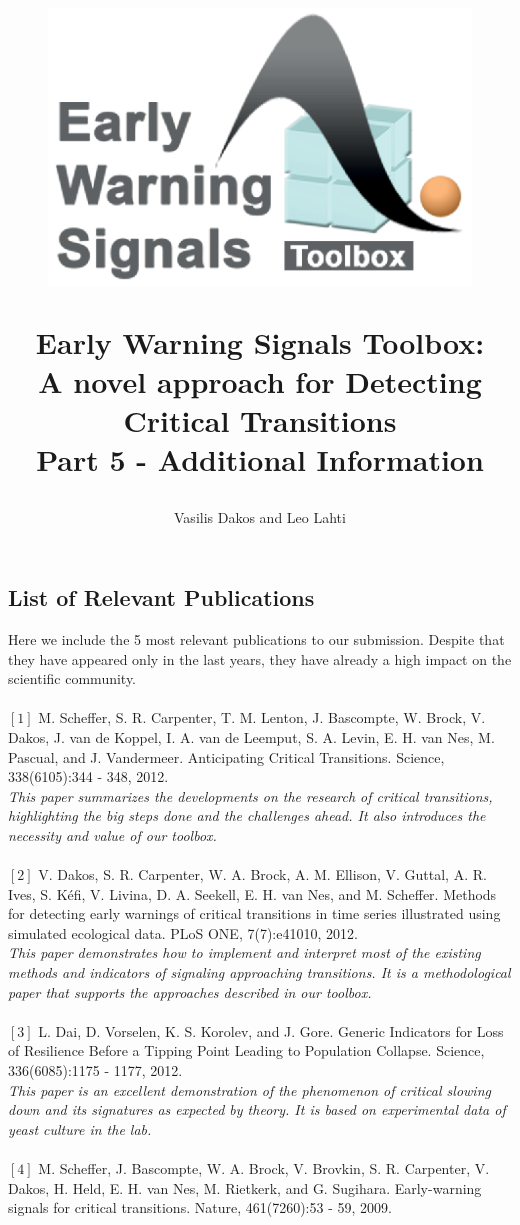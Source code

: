 \documentclass[12pt,a4paper,final]{article}
\author{Vasilis Dakos and Leo Lahti}
\title{
\begin{figure}[h]
\includegraphics[scale=0.55]{logoEWS.eps}
\end{figure}
Early Warning Signals Toolbox:\\ 
A novel approach for Detecting Critical Transitions\\
Part 5 - Additional Information
}
\begin{document}
\maketitle

\begin{doublespacing}

\section{List of Relevant Publications}
Here we include the 5 most relevant publications to our submission. Despite that they have appeared only in the last years, they have already a high impact on the scientific community.\\
\\
$[1]$ M. Scheffer, S. R. Carpenter, T. M. Lenton, J. Bascompte, W. Brock, V. Dakos, J. van de Koppel, I. A. van de Leemput, S. A. Levin, E. H. van Nes, M. Pascual, and J. Vandermeer. Anticipating Critical Transitions. Science, 338(6105):344 - 348, 2012.\\
\textit{This paper summarizes the developments on the research of critical transitions, highlighting the big steps done and the challenges ahead. It also introduces the necessity and value of our toolbox.}\\
\\
$[2]$ V. Dakos, S. R. Carpenter, W. A. Brock, A. M. Ellison, V. Guttal, A. R. Ives, S. K\'{e}fi, V. Livina, D. A. Seekell, E. H. van Nes, and M. Scheffer. Methods for detecting early warnings of critical transitions in time series illustrated using simulated ecological data. PLoS ONE,
7(7):e41010, 2012.\\
\textit{This paper demonstrates how to implement and interpret most of the existing methods and indicators of signaling approaching transitions. It is a methodological paper that supports the approaches described in our toolbox.}\\
\\
$[3]$  L. Dai, D. Vorselen, K. S. Korolev, and J. Gore. Generic Indicators for Loss of Resilience Before a Tipping Point Leading to Population Collapse. Science, 336(6085):1175 - 1177,  2012.\\
\textit{This paper is an excellent demonstration of the phenomenon of critical slowing down and its signatures as expected by theory. It is based on experimental data of yeast culture in the lab.}\\
\\
$[4]$ M. Scheffer, J. Bascompte, W. A. Brock, V. Brovkin, S. R. Carpenter, V. Dakos, H. Held, E. H. van Nes, M. Rietkerk, and G. Sugihara. Early-warning signals for critical transitions. Nature, 461(7260):53 - 59, 2009.\\

\end{doublespacing}
\end{document}
